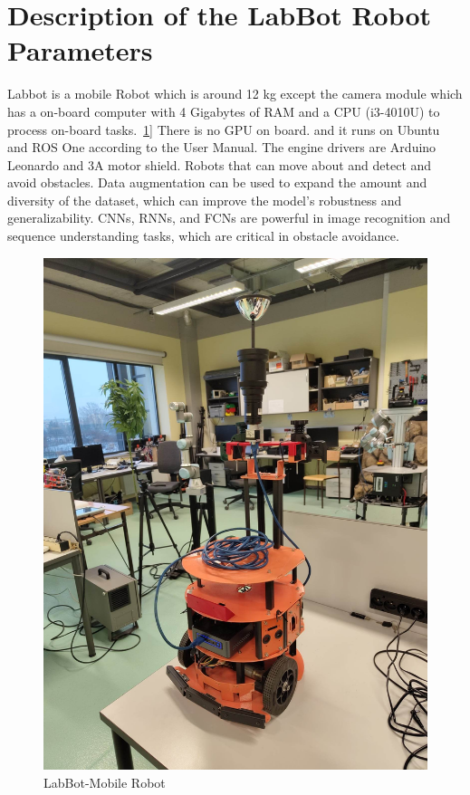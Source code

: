 \documentclass[11pt, a4paper, openany]{book}
\begin{document}
\section{Description of the LabBot Robot Parameters}
Labbot is a mobile Robot which is around 12 kg except the camera module which has a on-board computer with 4 Gigabytes of RAM and a CPU (i3-4010U) to process on-board tasks.~\ref{fig:1}]
There is no GPU on board. and it runs on Ubuntu and ROS One according to the User Manual. The engine drivers are Arduino  Leonardo and 3A motor shield.
Robots that can move about and detect and avoid obstacles. Data augmentation can be used to expand the amount and diversity of the dataset, which can improve the model's robustness and generalizability. CNNs, RNNs, and FCNs are powerful in image recognition and sequence understanding tasks, which are critical in obstacle avoidance.
\begin{figure}[H]
    \centering
    \includegraphics[scale=0.15]{Labbot&ele/2.jpg}
    \caption{LabBot-Mobile Robot}
    \label{fig:1} 
\end{figure}\
\end{document}

